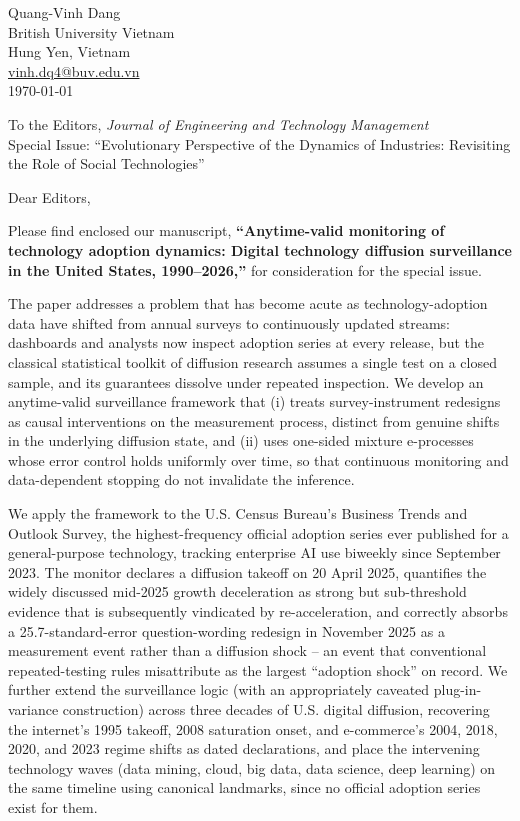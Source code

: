 \documentclass[11pt]{article}
\begin{document}
\begin{flushleft}
Quang-Vinh Dang\\
British University Vietnam\\
Hung Yen, Vietnam\\
\href{mailto:vinh.dq4@buv.edu.vn}{vinh.dq4@buv.edu.vn}\\[12pt]
\today\\[12pt]
\end{flushleft}

\noindent To the Editors, \emph{Journal of Engineering and Technology Management}\\
Special Issue: ``Evolutionary Perspective of the Dynamics of Industries: Revisiting the Role of Social Technologies''

\vspace{10pt}
\noindent Dear Editors,

\vspace{6pt}
\noindent Please find enclosed our manuscript, \textbf{``Anytime-valid monitoring of technology adoption dynamics: Digital technology diffusion surveillance in the United States, 1990--2026,''} for consideration for the special issue.

The paper addresses a problem that has become acute as technology-adoption data have shifted from annual surveys to continuously updated streams: dashboards and analysts now inspect adoption series at every release, but the classical statistical toolkit of diffusion research assumes a single test on a closed sample, and its guarantees dissolve under repeated inspection. We develop an anytime-valid surveillance framework that (i) treats survey-instrument redesigns as causal interventions on the measurement process, distinct from genuine shifts in the underlying diffusion state, and (ii) uses one-sided mixture e-processes whose error control holds uniformly over time, so that continuous monitoring and data-dependent stopping do not invalidate the inference.

We apply the framework to the U.S. Census Bureau's Business Trends and Outlook Survey, the highest-frequency official adoption series ever published for a general-purpose technology, tracking enterprise AI use biweekly since September 2023. The monitor declares a diffusion takeoff on 20 April 2025, quantifies the widely discussed mid-2025 growth deceleration as strong but sub-threshold evidence that is subsequently vindicated by re-acceleration, and correctly absorbs a 25.7-standard-error question-wording redesign in November 2025 as a measurement event rather than a diffusion shock -- an event that conventional repeated-testing rules misattribute as the largest ``adoption shock'' on record. We further extend the surveillance logic (with an appropriately caveated plug-in-variance construction) across three decades of U.S. digital diffusion, recovering the internet's 1995 takeoff, 2008 saturation onset, and e-commerce's 2004, 2018, 2020, and 2023 regime shifts as dated declarations, and place the intervening technology waves (data mining, cloud, big data, data science, deep learning) on the same timeline using canonical landmarks, since no official adoption series exist for them.
\end{document}
